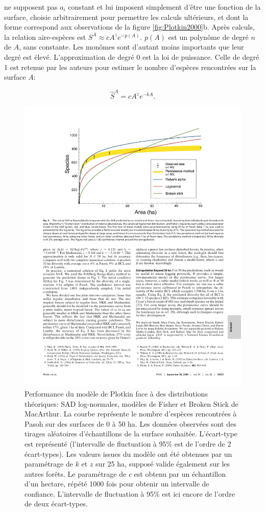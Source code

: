 \documentclass[
  11pt,
  french,
  a4paper,
  extrafontsizes,onecolumn,openright
  ]{memoir}
\begin{document}
\textcite{Plotkin2000} ne supposent pas \(a_i\) constant et lui imposent simplement d'être une fonction de la surface, choisie arbitrairement pour permettre les calculs ultérieurs, et dont la forme correspond aux observations de la figure \ref{fig:Plotkin2000}b.
Après calculs, la relation aire-espèces est \(S^{A}\approx cA^z e^{-p\left(A\right)}\).
\(p(A)\) est un polynôme de degré \(n\) de \(A\), sans constante.
Les monômes sont d'autant moins importants que leur degré est élevé.
L'approximation de degré 0 est la loi de puissance.
Celle de degré 1 est retenue par les auteurs pour estimer le nombre d'espèces rencontrées sur la surface \(A\):

\begin{equation}
  \label{eq:Plotkin2000}
  \hat{S}^{A} = cA^z e^{-kA}.
\end{equation}



\scriptsize

\begin{figure}

{\centering \includegraphics[width=0.8\linewidth]{images/Plotkin2000b} 

}

\caption{Performance du modèle de Plotkin face à des distributions théoriques: SAD log-normales, modèles de Fisher et Broken Stick de MacArthur. La courbe représente le nombre d'espèces rencontrées à Pasoh sur des surfaces de 0 à 50 ha. Les données observées sont des tirages aléatoires d'échantillons de la surface souhaitée. L'écart-type est représenté (l'intervalle de fluctuation à 95\% est de l'ordre de 2 écart-types). Les valeurs issues du modèle ont été obtenues par un paramétrage de \(k\) et \(z\) sur 25 ha, supposé valide également sur les autres forêts. Le paramétrage de \(c\) est obtenu par un échantillon d'un hectare, répété 1000 fois pour obtenir un intervalle de confiance. L'intervalle de fluctuation à 95\% est ici encore de l'ordre de deux écart-types.}\label{fig:Plotkin2000b}
\end{figure}
\end{document}
